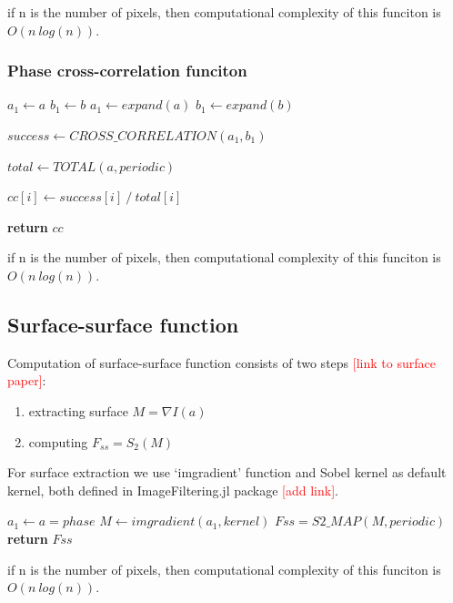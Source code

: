 \documentclass[reprint,amsmath,amssymb,aps,pre,showkeys,showpacs,nofootinbib]{revtex4-1}
\begin{document}
if n is the number of pixels, then computational complexity
of this funciton is $O(n\ log(n))$.

\subsubsection{Phase cross-correlation funciton}

\begin{algorithmic}[1]
      \State $a_1 \gets a$
      \State $b_1 \gets b$
    \Else
      \State $a_1 \gets expand(a)$
      \State $b_1 \gets expand(b)$
    \EndIf
    
    \State $success \gets CROSS\_CORRELATION(a_1, b_1)$

    \State $total \gets TOTAL(a, periodic)$

      \State $cc[i] \gets success[i]\ /\ total[i]$
    \EndFor

    \State \textbf{return} $cc$
  \EndProcedure
\end{algorithmic}

if n is the number of pixels, then computational complexity
of this funciton is $O(n\ log(n))$.

\subsection{Surface-surface function}

Computation of surface-surface function consists of two steps 
\textcolor{red}{[link to surface paper]}:
\begin{enumerate}
  \item extracting surface $M = \nabla I(a)$
  \item computing $F_{ss} = S_2(M)$
\end{enumerate}

For surface extraction we use `imgradient' function
and Sobel kernel as default kernel, 
both defined in ImageFiltering.jl package \textcolor{red}{[add link]}.

\begin{algorithmic}[1]
    \State $a_1 \gets a = phase$
    \State $M \gets imgradient(a_1, kernel)$
    \State $Fss = S2\_MAP(M, periodic)$
    \State \textbf{return} $Fss$
  \EndProcedure
\end{algorithmic}

if n is the number of pixels, then computational complexity
of this funciton is $O(n\ log(n))$.
\end{document}
